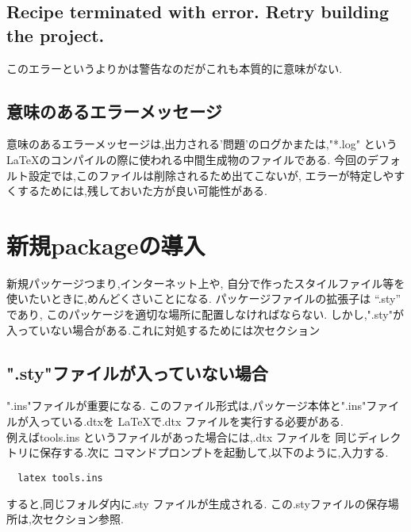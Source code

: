\documentclass{ltjsarticle}
\begin{document}
\subsection{Recipe terminated with error. Retry building the project.}
このエラーというよりかは警告なのだがこれも本質的に意味がない.
\subsection{意味のあるエラーメッセージ}
意味のあるエラーメッセージは,出力される'問題'のログかまたは,"*.log"
というLaTeXのコンパイルの際に使われる中間生成物のファイルである.
今回のデフォルト設定では,このファイルは削除されるため出てこないが,
エラーが特定しやすくするためには,残しておいた方が良い可能性がある.

\section{新規packageの導入}
新規パッケージつまり,インターネット上や,
自分で作ったスタイルファイル等を使いたいときに,めんどくさいことになる.
パッケージファイルの拡張子は “.sty” であり,
このパッケージを適切な場所に配置しなければならない.
しかし,".sty"が入っていない場合がある.これに対処するためには次セクション
\subsection{".sty"ファイルが入っていない場合}
".ins"ファイルが重要になる.
このファイル形式は,パッケージ本体と".ins"ファイルが入っている.dtxを
LaTeXで.dtx ファイルを実行する必要がある.\\
例えばtools.ins というファイルがあった場合には,.dtx ファイルを
同じディレクトリに保存する.次に
コマンドプロンプトを起動して,以下のように,入力する.
\begin{verbatim}
  latex tools.ins
\end{verbatim}
すると,同じフォルダ内に.sty ファイルが生成される.
この.styファイルの保存場所は,次セクション参照.
\end{document}
